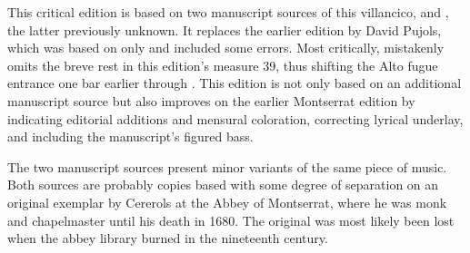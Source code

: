 \documentclass{vcscores}
\begin{document}

\begin{notesources}

\begin{source}
\end{source}

\begin{source}
\end{source}

\begin{source}
\end{source}

\end{notesources}

This critical edition is based on two manuscript sources of this villancico,  and , the latter previously unknown.
It replaces the earlier edition by David Pujols, which was based on  only and included some errors.
Most critically,  mistakenly omits the breve rest in this edition's measure 39, thus shifting the Alto fugue entrance one bar earlier through .
This edition is not only based on an additional manuscript source but also improves on the earlier Montserrat edition by indicating editorial additions and mensural coloration, correcting lyrical underlay, and including the manuscript's figured bass.

The two manuscript sources present minor variants of the same piece of music.
Both sources are probably copies based with some degree of separation on an original exemplar by Cererols at the Abbey of Montserrat, where he was monk and chapelmaster until his death in 1680.%
  \autocite{Bonastre:CererolsSymposium}
The original was most likely been lost when the abbey library burned in the nineteenth century.
\end{document}

